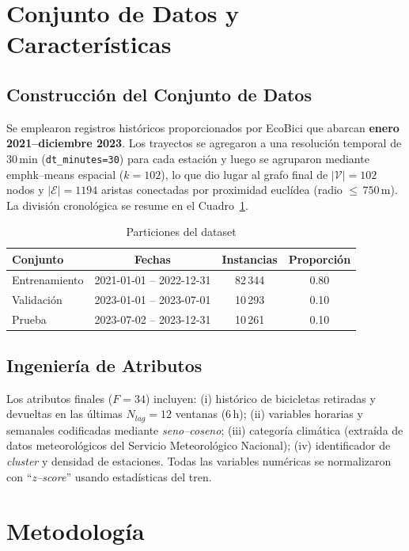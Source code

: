 \documentclass[conference]{IEEEtran}
\begin{document}
\section{Conjunto de Datos y Características}
\subsection{Construcción del Conjunto de Datos}
Se emplearon registros históricos proporcionados por EcoBici que abarcan
\textbf{enero 2021–diciembre 2023}. Los trayectos se agregaron a una
resolución temporal de $30$\,min (\texttt{dt\_minutes=30}) para cada estación y
luego se agruparon mediante \\emph{k–means} espacial ($k=102$), lo que dio lugar
al grafo final de $|\mathcal{V}|=102$ nodos y $|\mathcal{E}|=1194$ aristas
conectadas por proximidad euclídea (radio $\leq\,750$\,m). La división
cronológica se resume en el Cuadro~\ref{tab:splits}.

\begin{table}[!t]
  \centering
  \caption{Particiones del dataset}
  \label{tab:splits}
  \begin{tabular}{lccc}
    \toprule
    Conjunto & Fechas & Instancias & Proporción \\
    \midrule
    Entrenamiento & 2021-01-01 – 2022-12-31 & 82\,344 & 0.80 \\
    Validación    & 2023-01-01 – 2023-07-01 & 10\,293 & 0.10 \\
    Prueba        & 2023-07-02 – 2023-12-31 & 10\,261 & 0.10 \\
    \bottomrule
  \end{tabular}
\end{table}

\subsection{Ingeniería de Atributos}
Los atributos finales ($F=34$) incluyen: (i) histórico de bicicletas retiradas y
devueltas en las últimas $N_{lag}=12$ ventanas (6\,h); (ii) variables horarias y
semanales codificadas mediante \emph{seno–coseno}; (iii) categoría climática
(extraída de datos meteorológicos del Servicio Meteorológico Nacional);
(iv) identificador de \emph{cluster} y densidad de estaciones.
Todas las variables numéricas se normalizaron con ``\emph{z–score}'' usando
estadísticas del tren.

\section{Metodología}
\end{document}
